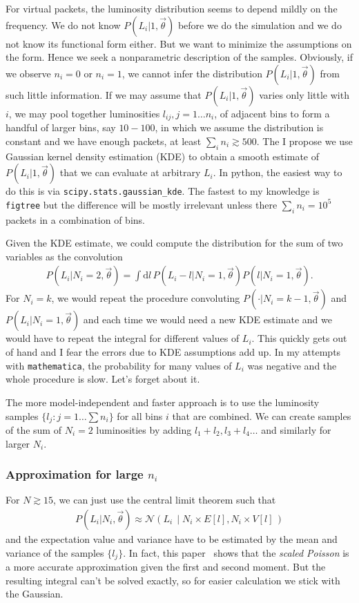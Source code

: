 \documentclass[a4,12pt]{article}
\newcommand{\given}[2]{\left(#1\, \middle| #2 \, \right)}
\newcommand{\gaussian}{\ensuremath{\mathcal{N}}}
\newcommand{\Lumi}{\ensuremath{L_i}}
\newcommand{\rmdx}[1]{\mbox{d} #1 \,} %
\newcommand{\vecth}{\ensuremath{{\vec{\theta}}}}
\begin{document}
For virtual packets, the luminosity distribution seems to depend
mildly on the frequency.  We do not know $P(\Lumi | 1, \vecth)$ before
we do the simulation and we do not know its functional form
either. But we want to minimize the assumptions on the form. Hence we
seek a nonparametric description of the samples. Obviously, if we
observe $n_i=0$ or $n_i=1$, we cannot infer the distribution $P(\Lumi
| 1, \vecth)$ from such little information. If we may assume that
$P(\Lumi | 1, \vecth)$ varies only little with $i$, we may pool
together luminosities $l_{ij}, j=1 \dots n_i$, of adjacent bins to
form a handful of larger bins, say $10-100$, in which we assume the
distribution is constant and we have enough packets, at least $\sum_i
n_i \gtrsim 500$. The I propose we use Gaussian kernel density
estimation (KDE) to obtain a smooth estimate of $P(\Lumi | 1, \vecth)$
that we can evaluate at arbitrary $\Lumi$. In python, the easiest way
to do this is via \texttt{scipy.stats.gaussian\_kde}. The fastest to
my knowledge is \texttt{figtree} but the difference will be mostly
irrelevant unless there $\sum_i n_i = 10^5$ packets in a combination
of bins.

Given the KDE estimate, we could compute the distribution for the sum
of two variables as the convolution
\begin{align}
  \label{eq:sum-of-2}
  P(\Lumi | N_i=2, \vecth) = \int \rmdx{l} P(\Lumi -l | N_i=1, \vecth) P(l | N_i=1, \vecth).
\end{align}
For $N_i =k$, we would repeat the procedure convoluting $P(\cdot |
N_i=k-1, \vecth)$ and $P(\Lumi | N_i=1, \vecth)$ and each time we
would need a new KDE estimate and we would have to repeat the integral
for different values of $\Lumi$. This quickly gets out of hand and I
fear the errors due to KDE assumptions add up. In my attempts with
\texttt{mathematica}, the probability for many values of $\Lumi$ was
negative and the whole procedure is slow. Let's forget about it.

The more model-independent and faster approach is to use the
luminosity samples $\{l_j: j=1 \dots \sum n_i\}$ for all bins $i$ that
are combined. We can create samples of the sum of $N_i=2$ luminosities
by adding $l_1+l_2, l_3 + l_4 \dots$ and similarly for larger
$N_i$.

\subsubsection*{Approximation for large $n_i$}

For $N \gtrsim 15$, we can just use the central limit theorem
such that
\begin{align}
  \label{eq:clt}
  P(\Lumi | N_i, \vecth) \approx \gaussian \given{\Lumi}{N_i \times E[l], N_i \times V[l]}
\end{align}
and the expectation value and variance have to be estimated by the mean
and variance of the samples $\{l_j\}$. In fact, this paper~\cite{bohm_statistics_2014}
shows that the \emph{scaled Poisson} is a more accurate approximation
given the first and second moment. But the resulting integral can't be
solved exactly, so for easier calculation we stick with the Gaussian.
\end{document}

